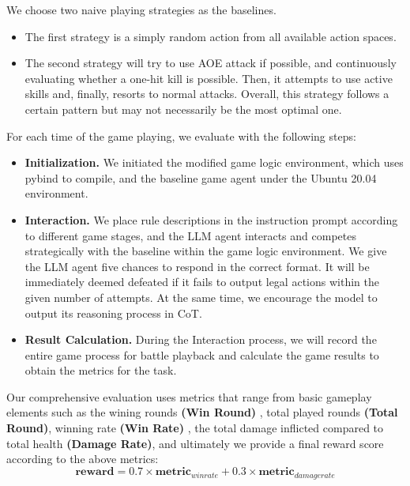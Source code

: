We choose two naive playing strategies as the baselines.
\begin{itemize}[leftmargin=1.5em,itemsep=0pt,parsep=0.2em,topsep=0.0em,partopsep=0.0em]
\item The first strategy is a simply random action from all available action spaces.
\item The second strategy will try to use AOE attack if possible, and continuously evaluating whether a one-hit kill is possible. Then, it attempts to use active skills and, finally, resorts to normal attacks. Overall, this strategy follows a certain pattern but may not necessarily be the most optimal one. 
\end{itemize}

For each time of the game playing, we evaluate with the following steps:

\begin{itemize}[leftmargin=1.5em,itemsep=0pt,parsep=0.2em,topsep=0.0em,partopsep=0.0em]
    \item \textbf{Initialization.} We initiated the modified game logic environment, which uses pybind to compile, and the baseline game agent under the Ubuntu 20.04 environment.
    \item \textbf{Interaction.} We place rule descriptions in the instruction prompt according to different game stages, and the LLM agent interacts and competes strategically with the baseline within the game logic environment. We give the LLM agent five chances to respond in the correct format. It will be immediately deemed defeated if it fails to output legal actions within the given number of attempts. At the same time, we encourage the model to output its reasoning process in CoT.
    \item \textbf{Result Calculation.} During the Interaction process, we will record the entire game process for battle playback and calculate the game results to obtain the metrics for the task.
\end{itemize}

Our comprehensive evaluation uses metrics that range from basic gameplay elements such as the wining rounds \textbf{(Win Round)} , total played rounds \textbf{(Total Round)}, winning rate \textbf{(Win Rate)} , the total damage inflicted compared to total health \textbf{(Damage Rate)}, 
and ultimately we provide a final reward score according to the above metrics: $$\mathbf{reward} = 0.7 \times \mathbf{metric}_{winrate} + 0.3 \times \mathbf{metric}_{damagerate}$$

